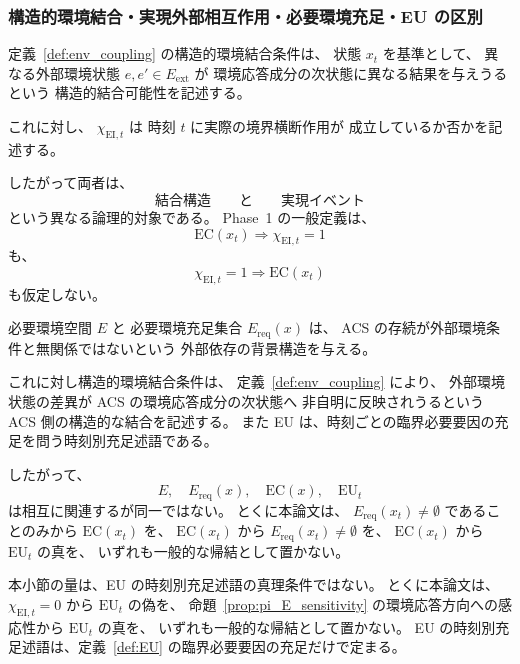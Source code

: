 \subsubsection{構造的環境結合・実現外部相互作用・必要環境充足・EU の区別}

\begin{remark}[構造的結合可能性と実現相互作用の区別]
\label{rem:ro_realized_interaction_distinction}
定義~\ref{def:env_coupling} の構造的環境結合条件は、
状態 $x_t$ を基準として、
異なる外部環境状態 $e,e'\in E_{\mathrm{ext}}$ が
環境応答成分の次状態に異なる結果を与えうるという
構造的結合可能性を記述する。

これに対し、
$\chi_{\mathrm{EI},t}$ は
時刻 $t$ に実際の境界横断作用が
成立しているか否かを記述する。

したがって両者は、
\[
  \text{結合構造}
  \qquad\text{と}\qquad
  \text{実現イベント}
\]
という異なる論理的対象である。
Phase~1 の一般定義は、
\[
  \mathrm{EC}(x_t)
  \Longrightarrow
  \chi_{\mathrm{EI},t}=1
\]
も、
\[
  \chi_{\mathrm{EI},t}=1
  \Longrightarrow
  \mathrm{EC}(x_t)
\]
も仮定しない。
\end{remark}

\begin{remark}
\label{rem:ereq_not_ro}
必要環境空間 $E$ と
必要環境充足集合 $E_{\mathrm{req}}(x)$ は、
ACS の存続が外部環境条件と無関係ではないという
外部依存の背景構造を与える。

これに対し構造的環境結合条件は、
定義~\ref{def:env_coupling} により、
外部環境状態の差異が
ACS の環境応答成分の次状態へ
非自明に反映されうるという
ACS 側の構造的な結合を記述する。
また EU は、時刻ごとの臨界必要要因の充足を問う時刻別充足述語である。

したがって、
\[
  E,\quad E_{\mathrm{req}}(x),\quad \mathrm{EC}(x),\quad \mathrm{EU}_t
\]
は相互に関連するが同一ではない。
とくに本論文は、
$E_{\mathrm{req}}(x_t)\neq\emptyset$ であることのみから
$\mathrm{EC}(x_t)$ を、
$\mathrm{EC}(x_t)$ から
$E_{\mathrm{req}}(x_t)\neq\emptyset$ を、
$\mathrm{EC}(x_t)$ から $\mathrm{EU}_t$ の真を、
いずれも一般的な帰結として置かない。
\end{remark}

\begin{remark}
\label{rem:env_coupling_not_eu_truth}
本小節の量は、EU の時刻別充足述語の真理条件ではない。
とくに本論文は、
$\chi_{\mathrm{EI},t}=0$ から $\mathrm{EU}_t$ の偽を、
命題~\ref{prop:pi_E_sensitivity} の環境応答方向への感応性から $\mathrm{EU}_t$ の真を、
いずれも一般的な帰結として置かない。
EU の時刻別充足述語は、定義~\ref{def:EU} の臨界必要要因の充足だけで定まる。
\end{remark}

